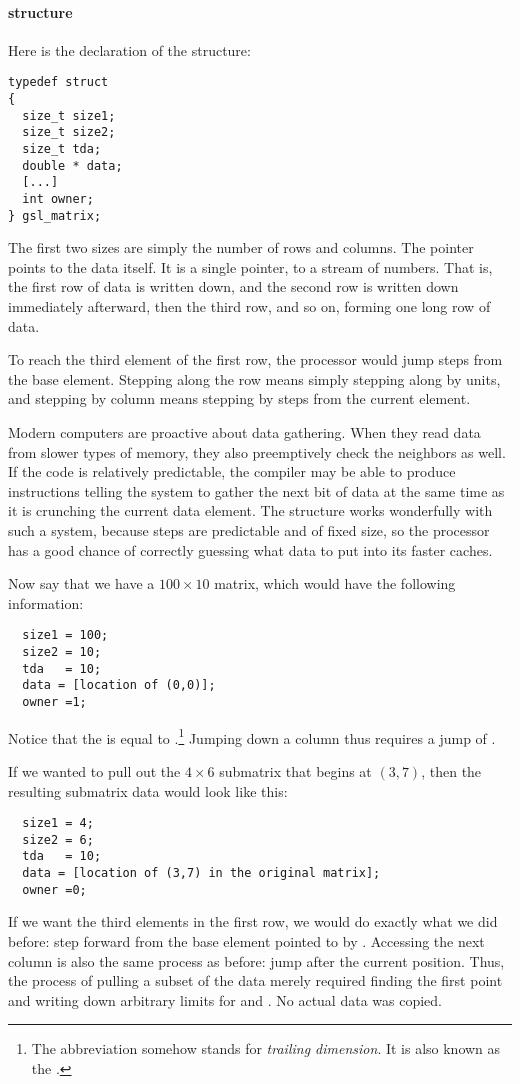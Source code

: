{\paragraph{ structure}} Here is the declaration of the
 structure:

\begin{lstlisting}
typedef struct
{
  size_t size1;
  size_t size2;
  size_t tda;
  double * data;
  [...]
  int owner;
} gsl_matrix;
\end{lstlisting}

The first two sizes are simply the number of rows and columns. The
 pointer points to the data itself. It is a single pointer, to
a stream of numbers. That is, the first row of data is written down, and
the second row is written down immediately afterward, then the third
row, and so on, forming one long row of data.

To reach the third element of the first row, the processor would jump
 steps from the base element.  Stepping along the row
means simply stepping along by  units, and stepping by
column means stepping by  steps from the current
element. 

Modern computers are proactive about data gathering. When they read data
from slower types of memory, they also preemptively check the neighbors
as well. If the code is relatively predictable, the compiler may be
able to produce instructions telling the system to gather the next bit
of data at the same time as it is crunching the current data element.
The  structure works wonderfully with such a system,
because steps are predictable and of fixed size, so the processor
has a good chance of correctly guessing what data to put into its
faster caches.

Now say that we have a $100 \times 10$ matrix, which would have the following information:
\begin{lstlisting}
  size1 = 100;
  size2 = 10;
  tda   = 10;
  data = [location of (0,0)];
  owner =1;
\end{lstlisting}
Notice that the    is equal to
.\footnote{The abbreviation  somehow stands for {\em trailing dimension}. It is also known as the .} Jumping down a column thus requires a jump of
.


If we wanted to pull out the $4 \times 6$ submatrix that begins at $(3, 7)$, then
the resulting submatrix data would look like this:
\begin{lstlisting}
  size1 = 4;
  size2 = 6;
  tda   = 10;
  data = [location of (3,7) in the original matrix];
  owner =0;
\end{lstlisting}
If we want the third elements in the first row, we would do exactly
what we did before: step  forward from the base
element pointed to by . Accessing the next column is also the
same process as before: jump  after the current
position. Thus, the process of pulling a subset of the data merely
required finding the first point and writing down arbitrary limits for
 and . No actual data was copied. 

